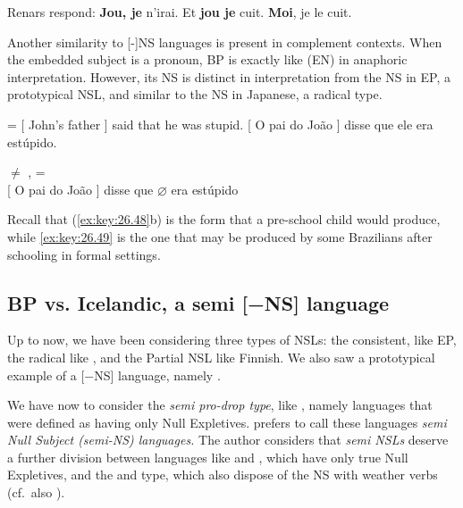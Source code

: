 \documentclass[output=paper]{langsci/langscibook}
\begin{document}
\ea%
    \label{ex:key:26.47}
    \ea Renars respond: \textbf{Jou, je} n’irai.
    \ex Et \textbf{jou je} cuit.
    \ex \textbf{Moi}, je le cuit.
    \z
\z

Another similarity to [-]NS languages is present in complement contexts. When
the embedded subject is a pronoun, \gls{BP} is exactly
like  (EN) in anaphoric interpretation. However, its NS is
distinct in interpretation from the NS in \gls{EP}, a
prototypical \gls{NSL}, and similar to the NS in
Japanese, a radical type.

\ea%
    \label{ex:key:26.48} = 
    \ea {}[ John’s father ] said that he was stupid.
    \ex {}[ O pai do João ] disse que ele era
    estúpido.\label{ex:key:26.48b}
    \z
\z

\ea%
    \label{ex:key:26.49}  $\neq$ ,  = \\
    {}[ O pai do João ] disse que $\varnothing$ era estúpido
\z

Recall that (\ref{ex:key:26.48}b) is the form that a pre-school child would
produce, while \eqref{ex:key:26.49} is the one that may be produced  by some
Brazilians after schooling in formal settings.

\subsection{BP vs. Icelandic, a semi [−NS] language}\label{sec:key:26.3.5}

Up to now, we have been considering three types of \gls{NSL}s: the consistent,
like \gls{EP}, the radical like , and the
Partial \gls{NSL} like Finnish. We also saw a prototypical example of a [−NS]
language, namely .

We have now to consider the \emph{semi pro-drop type}, like ,
namely languages that were defined as having only Null Expletives.
\citet{Biberauer2010} prefers to call these languages \emph{semi Null Subject
(semi-NS) languages.} The author considers that \emph{semi NSLs} deserve a
further division between languages like  and , which
have only true Null Expletives, and the  and  type, which also
dispose of the NS with weather verbs (cf.\ also \citealt{Huang2000}).
\end{document}
